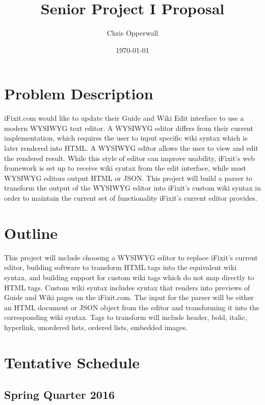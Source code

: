 \documentclass[letterpaper]{article}
\title{Senior Project I Proposal}
\author{Chris Opperwall}
\date{\today}
\begin{document}
\maketitle

\section{Problem Description}

iFixit.com would like to update their Guide and Wiki Edit interface to use a modern WYSIWYG text editor. A WYSIWYG editor differs from their current implementation, which requires the user to input specific wiki syntax which is later rendered into HTML. A WYSIWYG editor allows the user to view and edit the rendered result. While this style of editor can improve usability, iFixit’s web framework is set up to receive wiki syntax from the edit interface, while most WYSIWYG editors output HTML or JSON. This project will build a parser to transform the output of the WYSIWYG editor into iFixit’s custom wiki syntax in order to maintain the current set of functionality iFixit’s current editor provides.

\section{Outline}

This project will include choosing a WYSIWYG editor to replace iFixit’s current editor, building software to transform HTML tags into the equivalent wiki syntax, and building support for custom wiki tags which do not map directly to HTML tags. Custom wiki syntax includes syntax that renders into previews of Guide and Wiki pages on the iFixit.com. The input for the parser will be  either an HTML document or JSON object from the editor and transforming it into the corresponding wiki syntax. Tags to transform will include header, bold, italic, hyperlink, unordered lists, ordered lists, embedded images.

\section{Tentative Schedule}

\subsection{Spring Quarter 2016}
\end{document}
